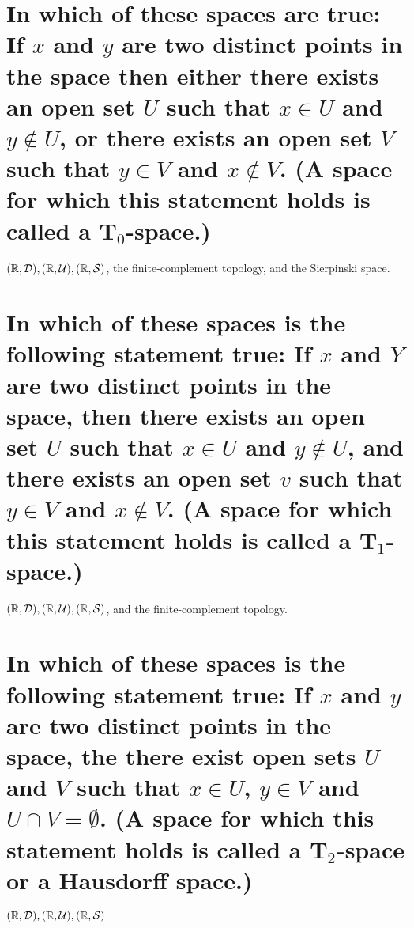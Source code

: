 \begin{parts}
 
 \part{In which of these spaces are true: If $x$ and $y$ are two distinct points in the space then either there exists an open set $U$ such that $x \in U$ and $y \notin U$, or there exists an open set $V$ such that $y \in V$ and $x \notin V$. (A space for which this statement holds is called a T$_0$-space.)}
 
\begin{solution}
 $(\mathbb{R}, \mathcal{D}), (\mathbb{R}, \mathcal{U}), (\mathbb{R}, \mathcal{S})$, the finite-complement topology, and the Sierpinski space.
\end{solution}

\part{In which of these spaces is the following statement true: If $x$ and $Y$ are two distinct points in the space, then there exists an open set $U$ such that $x \in U$ and $y \notin U$, and there exists an open set $v$ such that $y \in V$ and $x \notin V$. (A space for which this statement holds is called a T$_1$-space.)}

\begin{solution}
 $(\mathbb{R}, \mathcal{D}), (\mathbb{R}, \mathcal{U}), (\mathbb{R}, \mathcal{S})$, and the finite-complement topology.
\end{solution}

\part{In which of these spaces is the following statement true: If $x$ and $y$ are two distinct points in the space, the there exist open sets $U$ and $V$ such that $x \in U$, $y \in V$ and $U \cap V = \emptyset$. (A space for which this statement holds is called a T$_2$-space or a Hausdorff space.)}

\begin{solution}
  $(\mathbb{R}, \mathcal{D}), (\mathbb{R}, \mathcal{U}), (\mathbb{R}, \mathcal{S})$
\end{solution}

\end{parts}


